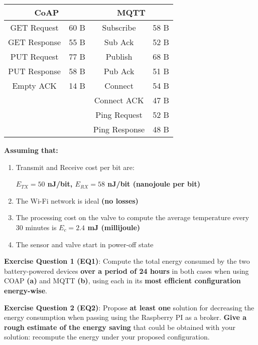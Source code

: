 \documentclass[a4paper,11pt]{article} %
\begin{document}
    \begin{center}
        \begin{tabular}{|c|c|c|c|}
            \hline
            \multicolumn{2}{|c|}{CoAP} & \multicolumn{2}{|c|}{MQTT} \\
            \hline
            GET Request  & 60 B & Subscribe     & 58 B \\
            \hline
            GET Response & 55 B & Sub Ack       & 52 B \\
            \hline
            PUT Request  & 77 B & Publish       & 68 B \\
            \hline
            PUT Response & 58 B & Pub Ack       & 51 B \\
            \hline
            Empty ACK    & 14 B & Connect       & 54 B \\
            \hline
            &      & Connect ACK   & 47 B \\
            \hline
            &      & Ping Request  & 52 B \\
            \hline
            &      & Ping Response & 48 B \\
            \hline
        \end{tabular}
    \end{center}

    \textbf{Assuming that:}

    \begin{enumerate}
        \item Transmit and Receive cost per bit are:

        \textbf{$E_{TX} = 50$ nJ/bit, $E_{RX} = 58$ nJ/bit (nanojoule per bit)}
        \item The Wi-Fi network is ideal \textbf{(no losses)}
        \item The processing cost on the valve to compute the average temperature every 30 minutes is \textbf{$E_c = 2.4$ mJ (millijoule)}
        \item The sensor and valve start in power-off state
    \end{enumerate}

    \textbf{Exercise Question 1 (EQ1)}: Compute the total energy consumed by the two battery-powered devices \textbf{over a period of 24 hours} in both cases when using COAP \textbf{(a)} and MQTT \textbf{(b)}, using each in its \textbf{most efficient configuration energy-wise}.

    \medskip

    \textbf{Exercise Question 2 (EQ2)}: Propose \textbf{at least one} solution for decreasing the energy consumption when passing using the Raspberry PI as a broker.
    \textbf{Give a rough estimate of the energy saving} that could be obtained with your solution: recompute the energy under your proposed configuration.
\end{document}
